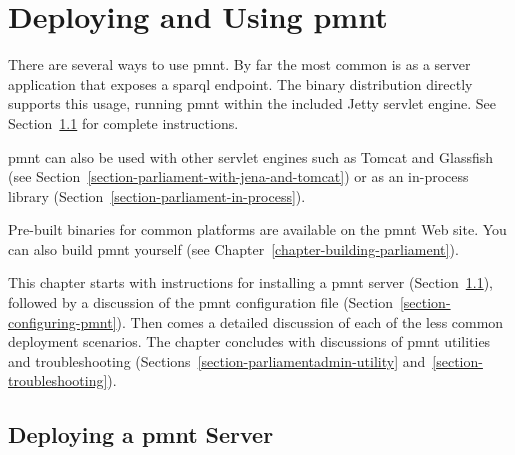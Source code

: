 
\chapter{Deploying and Using \acl{pmnt}}
\label{chapter-deploying-and-using}

There are several ways to use \ac{pmnt}.  By far the most common is as a server application that exposes a \ac{sparql} endpoint.  The binary distribution directly supports this usage, running \ac{pmnt} within the included Jetty servlet engine.  See Section~\ref{section-std-server-deploy} for complete instructions.

\ac{pmnt} can also be used with other servlet engines such as Tomcat and Glassfish (see Section~\ref{section-parliament-with-jena-and-tomcat}) or as an in-process library (Section~\ref{section-parliament-in-process}).

Pre-built binaries for common platforms are available on the \ac{pmnt} Web site.  You can also build \ac{pmnt} yourself (see Chapter~\ref{chapter-building-parliament}).

This chapter starts with instructions for installing a \ac{pmnt} server (Section~\ref{section-std-server-deploy}), followed by a discussion of the \ac{pmnt} configuration file (Section~\ref{section-configuring-pmnt}).  Then comes a detailed discussion of each of the less common deployment scenarios.  The chapter concludes with discussions of \ac{pmnt} utilities and troubleshooting (Sections~\ref{section-parliamentadmin-utility} and~\ref{section-troubleshooting}).

\section{Deploying a \ac{pmnt} Server}
\label{section-std-server-deploy}

